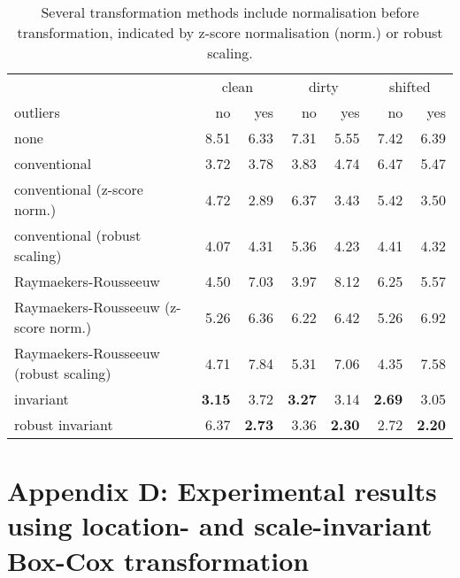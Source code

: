 \documentclass[
  a4paper,
]{article}
\begin{document}
\begin{table}
\begin{center}
\caption{
Several transformation methods include normalisation before transformation, indicated by z-score normalisation (norm.) or robust scaling.}
\label{tab:comparison_methods_simulations}
\begin{tabular}{l | r r r r r r}

\toprule
& \multicolumn{2}{c}{clean} & \multicolumn{2}{c}{dirty} & \multicolumn{2}{c}{shifted} \\
outliers & no & yes & no & yes & no & yes \\

\midrule

none                                  & 8.51          & 6.33          & 7.31          & 5.55          & 7.42          & 6.39 \\
conventional                          & 3.72          & 3.78          & 3.83          & 4.74          & 6.47          & 5.47 \\
conventional (z-score norm.)          & 4.72          & 2.89          & 6.37          & 3.43          & 5.42          & 3.50 \\
conventional (robust scaling)         & 4.07          & 4.31          & 5.36          & 4.23          & 4.41          & 4.32 \\
Raymaekers-Rousseeuw                  & 4.50          & 7.03          & 3.97          & 8.12          & 6.25          & 5.57 \\
Raymaekers-Rousseeuw (z-score norm.)  & 5.26          & 6.36          & 6.22          & 6.42          & 5.26          & 6.92 \\
Raymaekers-Rousseeuw (robust scaling) & 4.71          & 7.84          & 5.31          & 7.06          & 4.35          & 7.58 \\
invariant                             & \textbf{3.15} & 3.72          & \textbf{3.27} & 3.14          & \textbf{2.69} & 3.05 \\
robust invariant                      & 6.37          & \textbf{2.73} & 3.36          & \textbf{2.30} & 2.72          & \textbf{2.20} \\

\bottomrule
\end{tabular}
\end{center}
\end{table}

\section{Appendix D: Experimental results using location- and
scale-invariant Box-Cox
transformation}\label{appendix-d-experimental-results-using-location--and-scale-invariant-box-cox-transformation}
\end{document}
